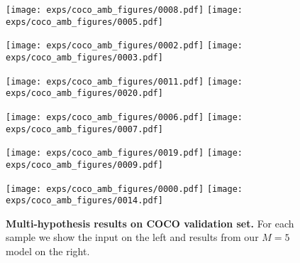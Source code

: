 \begin{figure*}[ht!]
    \centering

    \texttt{[image: exps/coco\_amb\_figures/0008.pdf]}%
    \texttt{[image: exps/coco\_amb\_figures/0005.pdf]}

    \texttt{[image: exps/coco\_amb\_figures/0002.pdf]}%
    \texttt{[image: exps/coco\_amb\_figures/0003.pdf]}

    \texttt{[image: exps/coco\_amb\_figures/0011.pdf]}%
    \texttt{[image: exps/coco\_amb\_figures/0020.pdf]}

    \texttt{[image: exps/coco\_amb\_figures/0006.pdf]}%
    \texttt{[image: exps/coco\_amb\_figures/0007.pdf]}

    \texttt{[image: exps/coco\_amb\_figures/0019.pdf]}%
    \texttt{[image: exps/coco\_amb\_figures/0009.pdf]}

    \texttt{[image: exps/coco\_amb\_figures/0000.pdf]}%
    \texttt{[image: exps/coco\_amb\_figures/0014.pdf]}

    \caption{%
    \textbf{Multi-hypothesis results on COCO validation set.}
    For each sample we show the input on the left and results from our $M=5$ model on the right.
    }\label{fig:amb_coco}
\end{figure*}
